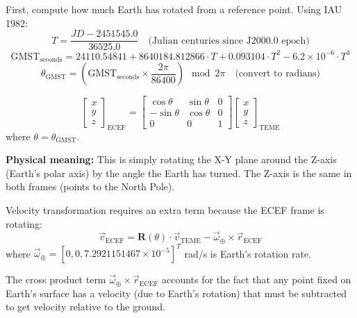 \documentclass[12pt,a4paper]{article}
\begin{document}
\begin{formulabox}[title=Formula: Greenwich Mean Sidereal Time (GMST)]
First, compute how much Earth has rotated from a reference point. Using IAU 1982:
\[
T = \frac{JD - 2451545.0}{36525.0} \quad \text{(Julian centuries since J2000.0 epoch)}
\]
\[
\text{GMST}_{\text{seconds}} = 24110.54841 + 8640184.812866 \cdot T + 0.093104 \cdot T^2 - 6.2 \times 10^{-6} \cdot T^3
\]
\[
\theta_{\text{GMST}} = \left(\text{GMST}_{\text{seconds}} \times \frac{2\pi}{86400}\right) \mod 2\pi \quad \text{(convert to radians)}
\]
\end{formulabox}

\begin{formulabox}[title=Formula: Position Rotation]
\[
\begin{bmatrix} x \\ y \\ z \end{bmatrix}_{\text{ECEF}} = \begin{bmatrix} \cos\theta & \sin\theta & 0 \\ -\sin\theta & \cos\theta & 0 \\ 0 & 0 & 1 \end{bmatrix} \begin{bmatrix} x \\ y \\ z \end{bmatrix}_{\text{TEME}}
\]
where $\theta = \theta_{\text{GMST}}$.

\textbf{Physical meaning:} This is simply rotating the X-Y plane around the Z-axis (Earth's polar axis) by the angle the Earth has turned. The Z-axis is the same in both frames (points to the North Pole).
\end{formulabox}

\begin{formulabox}[title=Formula: Velocity Rotation (with Coriolis Term)]
Velocity transformation requires an extra term because the ECEF frame is rotating:
\[
\vec{v}_{\text{ECEF}} = \mathbf{R}(\theta) \cdot \vec{v}_{\text{TEME}} - \vec{\omega}_{\oplus} \times \vec{r}_{\text{ECEF}}
\]
where $\vec{\omega}_{\oplus} = [0, 0, 7.2921151467 \times 10^{-5}]^T$ rad/s is Earth's rotation rate.

The cross product term $\vec{\omega}_{\oplus} \times \vec{r}_{\text{ECEF}}$ accounts for the fact that any point fixed on Earth's surface has a velocity (due to Earth's rotation) that must be subtracted to get velocity relative to the ground.
\end{formulabox}
\end{document}
